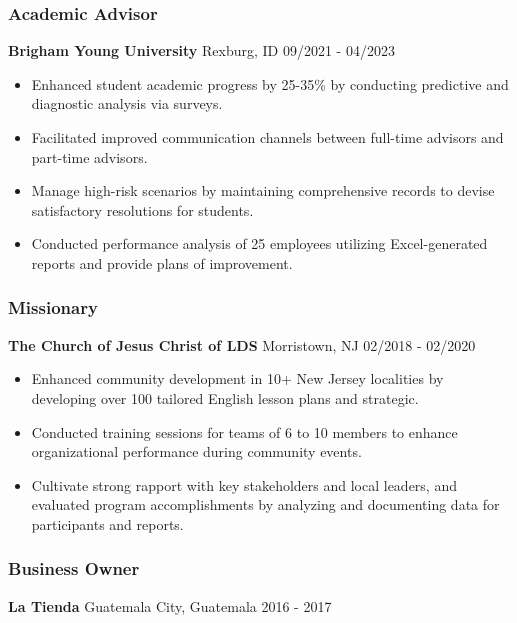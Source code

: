 \documentclass[
  letterpaper,
  DIV=11,
  numbers=noendperiod]{scrartcl}
\providecommand{\tightlist}{%
  \setlength{\itemsep}{0pt}\setlength{\parskip}{0pt}}\usepackage{longtable,booktabs,array}
\begin{document}
\subsubsection{Academic Advisor}\label{academic-advisor}

\textbf{Brigham Young University} \textbar{} Rexburg, ID \textbar{}
09/2021 - 04/2023

\begin{itemize}
\tightlist
\item
  Enhanced student academic progress by 25-35\% by conducting predictive
  and diagnostic analysis via surveys.
\item
  Facilitated improved communication channels between full-time advisors
  and part-time advisors.
\item
  Manage high-risk scenarios by maintaining comprehensive records to
  devise satisfactory resolutions for students.
\item
  Conducted performance analysis of 25 employees utilizing
  Excel-generated reports and provide plans of improvement.
\end{itemize}

\subsubsection{Missionary}\label{missionary}

\textbf{The Church of Jesus Christ of LDS} \textbar{} Morristown, NJ
\textbar{} 02/2018 - 02/2020

\begin{itemize}
\tightlist
\item
  Enhanced community development in 10+ New Jersey localities by
  developing over 100 tailored English lesson plans and strategic.
\item
  Conducted training sessions for teams of 6 to 10 members to enhance
  organizational performance during community events.
\item
  Cultivate strong rapport with key stakeholders and local leaders, and
  evaluated program accomplishments by analyzing and documenting data
  for participants and reports.
\end{itemize}

\subsubsection{Business Owner}\label{business-owner}

\textbf{La Tienda} \textbar{} Guatemala City, Guatemala \textbar{} 2016
- 2017
\end{document}
